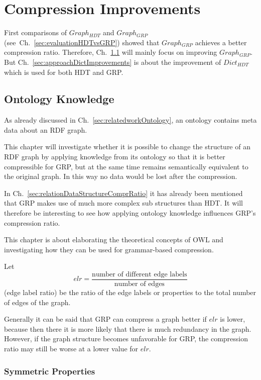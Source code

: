 \section{Compression Improvements}\label{sec:approachComprRatioImprovements}

First comparisons of $Graph_{HDT}$ and $Graph_{GRP}$ (see~Ch.~\ref{sec:evaluationHDTvsGRP}) showed that  $Graph_{GRP}$ achieves a better compression ratio. Therefore, Ch.~\ref{sec:approachOntKnowledge} will mainly focus on improving $Graph_{GRP}$. But Ch.~\ref{sec:approachDictImprovements} is about the improvement of $Dict_{HDT}$ which is used for both HDT and GRP.



\subsection{Ontology Knowledge}\label{sec:approachOntKnowledge}

As already discussed in Ch.~\ref{sec:relatedworkOntology}, an ontology contains meta data about an RDF graph.

This chapter will investigate whether it is possible to change the structure of an RDF graph by applying knowledge from its ontology so that it is better compressible for GRP, but at the same time remains semantically equivalent to the original graph. In this way no data would be lost after the compression.

In Ch.~\ref{sec:relationDataStructureComprRatio} it has already been mentioned that GRP makes use of much more complex sub structures than HDT. It will therefore be interesting to see how applying ontology knowledge influences GRP's compression ratio.

This chapter is about elaborating the theoretical concepts of OWL and investigating how they can be used for grammar-based compression.

Let \[ elr = \dfrac{\text{number of different edge labels}}{\text{number of edges}} \] (edge label ratio) be the ratio of the edge labels or properties to the total number of edges of the graph. 

Generally it can be said that GRP can compress a graph better if $elr$ is lower, because then there it is more likely that there is much redundancy in the graph. However, if the graph structure becomes unfavorable for GRP, the compression ratio may still be worse at a lower value for $elr$.


\subsubsection{Symmetric Properties}

